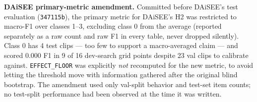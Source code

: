 \textbf{DAiSEE primary-metric amendment.}
Committed before DAiSEE's test evaluation (\texttt{347115b}), the primary
metric for DAiSEE's H2 was restricted to macro-F1 over classes 1--3, excluding
class 0 from the average (reported separately as a raw count and raw F1 in
every table, never dropped silently). Class 0 has
4 test clips --- too few to support a macro-averaged claim --- and scored
0.000 F1 in 9 of 16 dev-search grid points despite 23 val clips to calibrate
against. \texttt{EFFECT\_FLOOR} was explicitly \emph{not} recomputed for the
new metric, to avoid letting the threshold move with information gathered
after the original blind bootstrap. The amendment used only val-split
behavior and test-set item counts; no test-split performance had been
observed at the time it was written.
